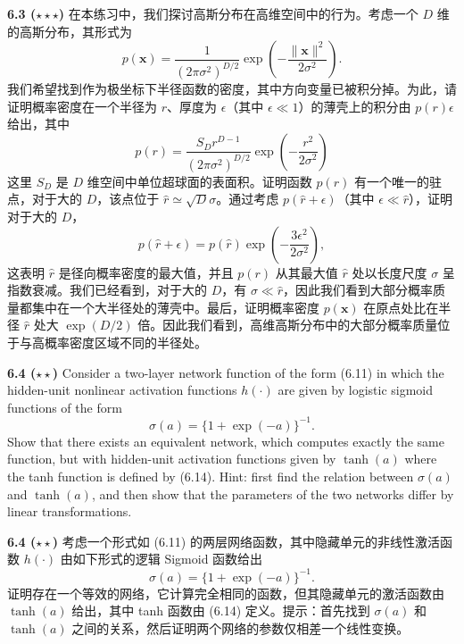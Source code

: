 \documentclass{article}
\begin{document}
\textbf{6.3 ($\star\star\star$)} 在本练习中，我们探讨高斯分布在高维空间中的行为。考虑一个 $D$ 维的高斯分布，其形式为
\begin{equation}
p(\mathbf{x}) = \frac{1}{(2\pi\sigma^2)^{D/2}} \exp\left(-\frac{\|\mathbf{x}\|^2}{2\sigma^2}\right).
\tag{6.57}
\end{equation}
我们希望找到作为极坐标下半径函数的密度，其中方向变量已被积分掉。为此，请证明概率密度在一个半径为 $r$、厚度为 $\epsilon$（其中 $\epsilon \ll 1$）的薄壳上的积分由 $p(r)\epsilon$ 给出，其中
\begin{equation}
p(r) = \frac{S_D r^{D-1}}{(2\pi\sigma^2)^{D/2}} \exp\left(-\frac{r^2}{2\sigma^2}\right)
\tag{6.58}
\end{equation}
这里 $S_D$ 是 $D$ 维空间中单位超球面的表面积。证明函数 $p(r)$ 有一个唯一的驻点，对于大的 $D$，该点位于 $\widehat{r} \simeq \sqrt{D}\sigma$。通过考虑 $p(\widehat{r}+\epsilon)$（其中 $\epsilon \ll \widehat{r}$），证明对于大的 $D$，
\begin{equation}
p(\widehat{r}+\epsilon) = p(\widehat{r}) \exp\left(-\frac{3\epsilon^2}{2\sigma^2}\right),
\tag{6.59}
\end{equation}
这表明 $\widehat{r}$ 是径向概率密度的最大值，并且 $p(r)$ 从其最大值 $\widehat{r}$ 处以长度尺度 $\sigma$ 呈指数衰减。我们已经看到，对于大的 $D$，有 $\sigma \ll \widehat{r}$，因此我们看到大部分概率质量都集中在一个大半径处的薄壳中。最后，证明概率密度 $p(\mathbf{x})$ 在原点处比在半径 $\widehat{r}$ 处大 $\exp(D/2)$ 倍。因此我们看到，高维高斯分布中的大部分概率质量位于与高概率密度区域不同的半径处。

\vspace{1em}

\textbf{6.4 ($\star\star$)} Consider a two-layer network function of the form (6.11) in which the hidden-unit nonlinear activation functions $h(\cdot)$ are given by logistic sigmoid functions of the form
\begin{equation}
\sigma(a) = \{1 + \exp(-a)\}^{-1}.
\tag{6.60}
\end{equation}
Show that there exists an equivalent network, which computes exactly the same function, but with hidden-unit activation functions given by $\tanh(a)$ where the tanh function is defined by (6.14). Hint: first find the relation between $\sigma(a)$ and $\tanh(a)$, and then show that the parameters of the two networks differ by linear transformations.

\textbf{6.4 ($\star\star$)} 考虑一个形式如 (6.11) 的两层网络函数，其中隐藏单元的非线性激活函数 $h(\cdot)$ 由如下形式的逻辑 Sigmoid 函数给出
\begin{equation}
\sigma(a) = \{1 + \exp(-a)\}^{-1}.
\tag{6.60}
\end{equation}
证明存在一个等效的网络，它计算完全相同的函数，但其隐藏单元的激活函数由 $\tanh(a)$ 给出，其中 tanh 函数由 (6.14) 定义。提示：首先找到 $\sigma(a)$ 和 $\tanh(a)$ 之间的关系，然后证明两个网络的参数仅相差一个线性变换。
\end{document}
